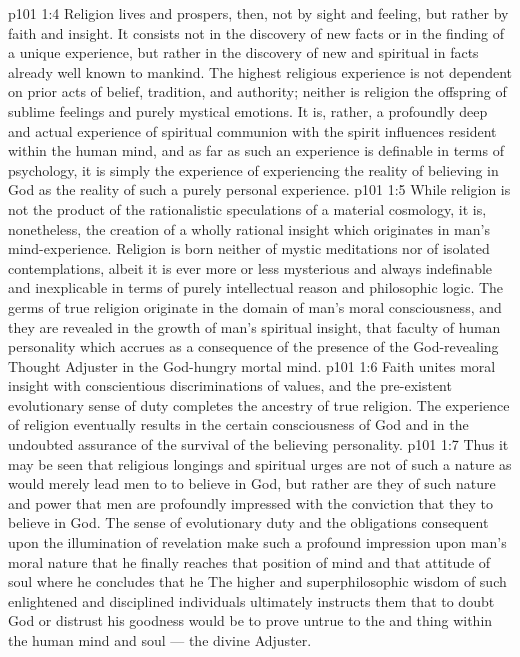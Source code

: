 \vs p101 1:4 Religion lives and prospers, then, not by sight and feeling, but rather by faith and insight. It consists not in the discovery of new facts or in the finding of a unique experience, but rather in the discovery of new and spiritual  in facts already well known to mankind. The highest religious experience is not dependent on prior acts of belief, tradition, and authority; neither is religion the offspring of sublime feelings and purely mystical emotions. It is, rather, a profoundly deep and actual experience of spiritual communion with the spirit influences resident within the human mind, and as far as such an experience is definable in terms of psychology, it is simply the experience of experiencing the reality of believing in God as the reality of such a purely personal experience.
\vs p101 1:5 \pc While religion is not the product of the rationalistic speculations of a material cosmology, it is, nonetheless, the creation of a wholly rational insight which originates in man’s mind\hyp{}experience. Religion is born neither of mystic meditations nor of isolated contemplations, albeit it is ever more or less mysterious and always indefinable and inexplicable in terms of purely intellectual reason and philosophic logic. The germs of true religion originate in the domain of man’s moral consciousness, and they are revealed in the growth of man’s spiritual insight, that faculty of human personality which accrues as a consequence of the presence of the God\hyp{}revealing Thought Adjuster in the God\hyp{}hungry mortal mind.
\vs p101 1:6 Faith unites moral insight with conscientious discriminations of values, and the pre\hyp{}existent evolutionary sense of duty completes the ancestry of true religion. The experience of religion eventually results in the certain consciousness of God and in the undoubted assurance of the survival of the believing personality.
\vs p101 1:7 Thus it may be seen that religious longings and spiritual urges are not of such a nature as would merely lead men to  to believe in God, but rather are they of such nature and power that men are profoundly impressed with the conviction that they  to believe in God. The sense of evolutionary duty and the obligations consequent upon the illumination of revelation make such a profound impression upon man’s moral nature that he finally reaches that position of mind and that attitude of soul where he concludes that he  The higher and superphilosophic wisdom of such enlightened and disciplined individuals ultimately instructs them that to doubt God or distrust his goodness would be to prove untrue to the  and  thing within the human mind and soul --- the divine Adjuster.
